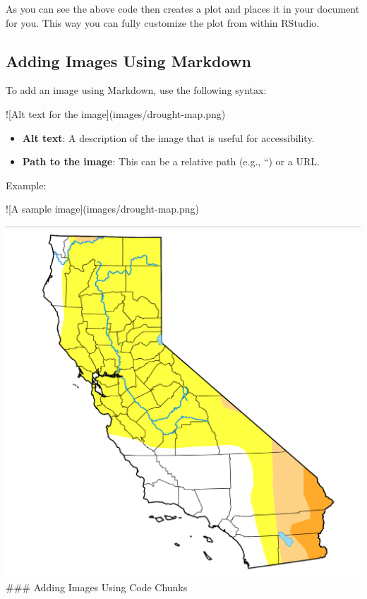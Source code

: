\documentclass[
]{book}
\newenvironment{Shaded}{\begin{snugshade}}{\end{snugshade}}
\newcommand{\AlertTok}[1]{\textcolor[rgb]{0.94,0.16,0.16}{#1}}
\providecommand{\tightlist}{%
  \setlength{\itemsep}{0pt}\setlength{\parskip}{0pt}}
\theoremstyle{definition}
\theoremstyle{definition}
\theoremstyle{definition}
\theoremstyle{definition}
\theoremstyle{remark}
\begin{document}
As you can see the above code then creates a plot and places it in your document for you. This way you can fully customize the plot from within RStudio.

\subsection{Adding Images Using Markdown}\label{adding-images-using-markdown}

To add an image using Markdown, use the following syntax:

\begin{Shaded}
\begin{Highlighting}[]
\AlertTok{![Alt text for the image](images/drought{-}map.png)}
\end{Highlighting}
\end{Shaded}

\begin{itemize}
\tightlist
\item
  \textbf{Alt text}: A description of the image that is useful for accessibility.
\item
  \textbf{Path to the image}: This can be a relative path (e.g., ``) or a URL.
\end{itemize}

Example:

\begin{Shaded}
\begin{Highlighting}[]
\AlertTok{![A sample image](images/drought{-}map.png)}
\end{Highlighting}
\end{Shaded}

\includegraphics{images/drought-map.png}
\#\#\# Adding Images Using Code Chunks
\end{document}
